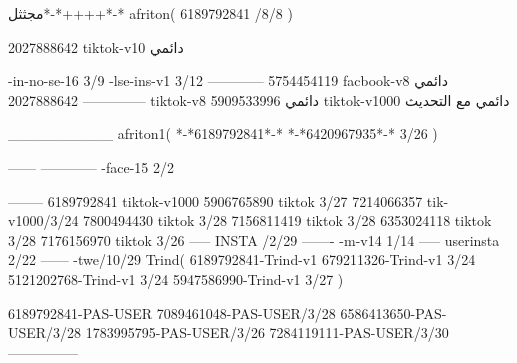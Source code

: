 مجثثل*-*++++*-*
afriton(
6189792841 /8/8
)

2027888642 tiktok-v10
دائمي

-in-no-se-16 3/9
-lse-ins-v1 3/12
------------
5754454119 facbook-v8
دائمي
--------------
2027888642 tiktok-v8
دائمي
5909533996 tiktok-v1000
دائمي مع التحديث

__________
afriton1(
*-*6189792841*-*
*-*6420967935*-* 3/26
)


------
------------
-face-15 2/2

--------
6189792841 tiktok-v1000
5906765890 tiktok 3/27
7214066357 tik-v1000/3/24
7800494430 tiktok 3/28
7156811419 tiktok 3/28
6353024118 tiktok 3/28
7176156970 tiktok 3/26
-----
 INSTA /2/29
-------
-m-v14 1/14
-----
userinsta 2/22
------
-twe/10/29
Trind(
6189792841-Trind-v1 
679211326-Trind-v1 3/24
5121202768-Trind-v1 3/24
5947586990-Trind-v1 3/27
)

6189792841-PAS-USER
7089461048-PAS-USER/3/28
6586413650-PAS-USER/3/28
1783995795-PAS-USER/3/26
7284119111-PAS-USER/3/30
    ---------------
